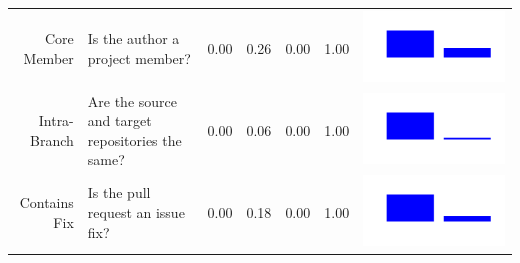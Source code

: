 \documentclass[conference]{IEEEtran}
\begin{document}
\begin{table}[ht]
\begin{tabular}{rp{26em}rrrrc}
    Core Member & Is the author a project member? & 0.00 & 0.26 & 0.00 & 1.00 & \includegraphics[scale = 0.1, clip = true, trim= 50px 60px 50px 60px]{../figs/hist-features/hist-coreMember.pdf} \\
    Intra-Branch & Are the source and target repositories the same? & 0.00 & 0.06 & 0.00 & 1.00 & \includegraphics[scale = 0.1, clip = true, trim= 50px 60px 50px 60px]{../figs/hist-features/hist-intraBranch.pdf} \\
    Contains Fix & Is the pull request an issue fix? & 0.00 & 0.18 & 0.00 & 1.00 & \includegraphics[scale = 0.1, clip = true, trim= 50px 60px 50px 60px]{../figs/hist-features/hist-containsFix.pdf} \\

\end{tabular}
\end{table}
\end{document}
